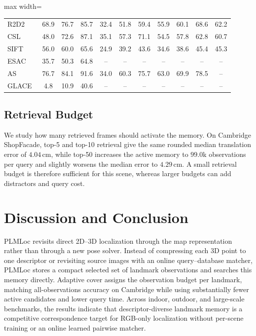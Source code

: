 \documentclass[letterpaper,10 pt,conference]{ieeeconf}
\newcommand{\method}{PLMLoc}
\begin{document}
\begin{table}[!t]
\begin{adjustbox}{max width=\textwidth}
\begin{tabular}{@{}lcccccccccc@{}}
        R2D2~\cite{revaud2019r2d2} & 68.9 & 76.7 & 85.7 & 32.4 & 51.8 & 59.4 & 55.9 & 60.1 & 68.6 & 62.2 \\
        CSL~\cite{svarm2017csl} & 48.0 & 72.6 & 87.1 & 35.1 & 57.3 & 71.1 & 54.5 & 57.8 & 62.8 & 60.7 \\
        SIFT~\cite{lowe2004sift} & 56.0 & 60.0 & 65.6 & 24.9 & 39.2 & 43.6 & 34.6 & 38.6 & 45.4 & 45.3 \\
        ESAC~\cite{brachmann2019esac} & 35.7 & 50.3 & 64.8 & -- & -- & -- & -- & -- & -- & -- \\
        AS~\cite{sattler2012active} & 76.7 & 84.1 & 91.6 & 34.0 & 60.3 & 75.7 & 63.0 & 69.9 & 78.5 & -- \\
        GLACE~\cite{wang2024glace} & 4.8 & 10.9 & 40.6 & -- & -- & -- & -- & -- & -- & -- \\
        \bottomrule
    \end{tabular}
    \end{adjustbox}
\end{table}

\subsection{Retrieval Budget}

We study how many retrieved frames should activate the memory. On Cambridge ShopFacade, top-5 and top-10 retrieval give the same rounded median translation error of $4.04$\,cm, while top-50 increases the active memory to $99.0$k observations per query and slightly worsens the median error to $4.29$\,cm. A small retrieval budget is therefore sufficient for this scene, whereas larger budgets can add distractors and query cost.

\section{Discussion and Conclusion}

\method{} revisits direct 2D--3D localization through the map representation rather than through a new pose solver. Instead of compressing each 3D point to one descriptor or revisiting source images with an online query--database matcher, \method{} stores a compact selected set of landmark observations and searches this memory directly. Adaptive cover assigns the observation budget per landmark, matching all-observations accuracy on Cambridge while using substantially fewer active candidates and lower query time. Across indoor, outdoor, and large-scale benchmarks, the results indicate that descriptor-diverse landmark memory is a competitive correspondence target for RGB-only localization without per-scene training or an online learned pairwise matcher.
\end{document}
